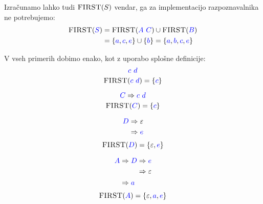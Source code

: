 \documentclass{article}
\newcommand{\FIRST}{\textsc{FIRST}}
\newcommand{\Symbol}[1]{\textcolor{blue}{#1}}
\newcommand{\Null}{\varepsilon}
\newcommand{\Derive}{\Rightarrow}
\newcommand{\Seq}{\ }
\begin{document}
Izračunamo lahko tudi $\FIRST(S)$ vendar, ga za implementacijo razpoznavalnika ne potrebujemo:
\begin{align*}
  \FIRST(\Symbol{S}) &= \FIRST(\Symbol{A} \Seq \Symbol{C}) \cup \FIRST(\Symbol{B}) \\
            &= \{\Symbol{a}, \Symbol{c}, \Symbol{e}\} \cup \{\Symbol{b}\} = \{\Symbol{a}, \Symbol{b}, \Symbol{c}, \Symbol{e}\}
\end{align*}

V vseh primerih dobimo enako, kot z uporabo splošne definicije:
\begin{equation*}
  \Symbol{c} \Seq \Symbol{d}
\end{equation*}
\begin{equation*}
  \FIRST(\Symbol{c} \Seq \Symbol{d}) = \{\Symbol{c}\}
\end{equation*}

\begin{equation*}
  \Symbol{C} \Derive \Symbol{c} \Seq \Symbol{d}
\end{equation*}
\begin{equation*}
  \FIRST(\Symbol{C}) = \{\Symbol{c}\}
\end{equation*}

\begin{equation*}
  \Symbol{D} \begin{aligned}[t]
    &\Derive \Null\\
    &\Derive \Symbol{e}\\
  \end{aligned}
\end{equation*}
\begin{equation*}
  \FIRST(\Symbol{D}) = \{\Null, \Symbol{e}\}
\end{equation*}

\begin{equation*}
  \Symbol{A} \begin{aligned}[t]
    &\Derive \Symbol{D} \begin{aligned}[t]
      &\Derive \Symbol{e} \\
      &\Derive \Null\\
    \end{aligned}\\
    &\Derive \Symbol{a}
  \end{aligned}
\end{equation*}
\begin{equation*}
  \FIRST(\Symbol{A}) = \{\Null, \Symbol{a}, \Symbol{e}\}
\end{equation*}
\end{document}
